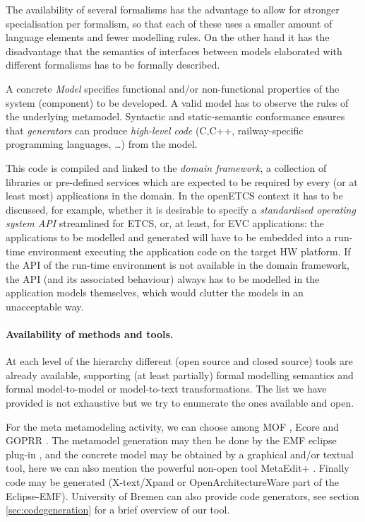 \documentclass[11pt, a4paper]{article}
\begin{document}
The availability of several formalisms has the advantage to allow for stronger specialisation per formalism, so that each of these uses a smaller amount of language
elements and fewer modelling rules. On the other hand it has the disadvantage that the semantics of interfaces between models elaborated with different formalisms has to be formally described.

A concrete \emph{Model} specifies functional and/or non-functional properties of the system (component) to be developed. A valid model has to observe the rules of the underlying metamodel. Syntactic and static-semantic conformance ensures that \emph{generators}  can produce \emph{high-level code} (C,C++, railway-specific programming languages, \ldots) from the model. 

This code is compiled and linked to the \emph{domain framework}, a collection of libraries or pre-defined services which are expected to be required by every (or at least most) applications in the domain.
In the openETCS context it has to be discussed, for example, whether it is desirable to specify a 
\emph{standardised operating system API} streamlined for ETCS, or, at least, for EVC applications: the applications to be modelled and generated will have to be embedded into a run-time environment executing the application code on the target HW platform. If the API of the run-time environment is not available in the domain framework, the API (and its associated behaviour) always has to be modelled in the
application models themselves, which would clutter the models in an unacceptable way.




\paragraph{Availability of methods and tools.}
At each level of the hierarchy different
(open source and closed source) tools are already available, supporting  (at least partially) 
formal modelling semantics and formal model-to-model or
model-to-text transformations. The list we have provided is not exhaustive but we try
to enumerate the ones available and open.

For the meta metamodeling activity, we can choose among MOF \cite{MOF-spec},
Ecore \cite{EMF-Ecore} and GOPRR \cite{GOPRR}. 
The metamodel generation may then be done by the EMF eclipse plug-in \cite{Steinberg:2009:EEM:1197540}, and the 
concrete model may be obtained by a graphical and/or textual tool, here we can
also mention the powerful non-open tool MetaEdit+ \cite{MetaEdit} . 
Finally code may be generated (X-text/Xpand or OpenArchitectureWare part of the
Eclipse-EMF). University of Bremen can
also provide code generators, see section \ref{sec:codegeneration} for a brief
overview of our tool.
\end{document}
